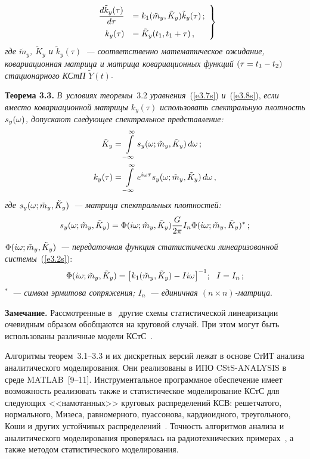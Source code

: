 \begin{multicols}{2}
\vspace*{-3pt}

\noindent
\begin{equation}
\left.
\begin{array}{rl}
\displaystyle\frac{\displaystyle d\tilde k_y(\tau)\mathstrut}{\displaystyle d\tau\mathstrut}  &= k_1 (\tilde m_y , \tilde K_y) \tilde k_y(\tau)\,;\\[9pt]
k_y(\tau)&=\tilde{K}_y(t_1,t_1+\tau)\,,
\end{array}
\right\}
\label{e3.8s}
\end{equation}
\textit{где $\tilde m_y$, $\tilde K_y$ и $\tilde k_y(\tau)$~--- соответственно 
математическое ожидание, ковариационная матрица и матрица 
ковариационных функций $(\tau \hm= t_1 \hm- t_2)$ стационарного КСтП $\tilde Y(t)$}.

\smallskip

\noindent
\textbf{Теорема 3.3.} \textit{В~условиях теоремы}~3.2 \textit{уравнения}~(\ref{e3.7s}) 
\textit{и}~(\ref{e3.8s}), \textit{если вместо ковариационной матрицы $k_y(\tau)$ 
использовать спектральную плотность  $s_y(\omega)$, допускают следующее спектральное представление:
\begin{align*}
\tilde K_y &=\iin s_y(\w; \tilde m_y, \tilde K_y)\, d\w\,; %
\\
k_y(\tau) &=\iin e^{i\w\tau} s_y (\w; \tilde m_y, \tilde K_y)\, d\w\,, %
\end{align*}
где $s_y (\omega; \tilde m_y, \tilde K_y)$~--- матрица спектральных плот\-ностей:
\begin{equation*}
s_y (\w; \tilde m_y, \tilde K_y) = \Phi (i\w; \tilde m_y, \tilde K_y) 
\fr{G}{2\pi} I_n \Phi (i\w; \tilde m_y, \tilde K_y)^*\,; %
\end{equation*}
$\Phi (i\omega; \tilde m_y, \tilde K_y)$~--- передаточная функция 
статистически линеаризованной системы}~(\ref{e3.2s}):
 \begin{equation*}
 \Phi (i\omega; \tilde m_y, \tilde K_y) = \left[k_1 (\tilde m_y,\tilde  K_y) - Ii\omega\right]^{-1}\!;
 \ \ I=I_n\,;
 \end{equation*}
\textit{$^*$~--- символ эрмитова сопряжения; $I_n$~--- единичная $(n\times n)$-мат\-рица}.


\medskip

\noindent
\textbf{Замечание.} Рассмотренные в~\cite{1-sin} другие схемы статистической линеаризации 
очевидным образом обобщаются на круговой случай. При этом могут быть использованы различные 
модели КСтС~\cite{9-sin}.

Алгоритмы теорем~3.1--3.3 и их дискретных версий лежат в основе СтИТ
анализа аналитического моделирования. Они реализованы  в ИПО\linebreak
CStS-ANALYSIS в среде  MATLAB~[9--11]. Инструментальное программное
обеспечение имеет возможность
реализовать также и статистическое моделирование КСтС для
следующих <<намотанных>> круговых распределений КСВ: решетчатого,
нормального,  Мизеса, равномерного, пуассонова, кардиоидного,
треугольного, Коши и других устойчивых распределений~\cite{4-sin, 7-sin}.
Точность алгоритмов анализа и аналитического моделирования
проверялась на радиотехнических примерах~\cite{6-sin}, а также методом
статистического моделирования.


\end{multicols}
